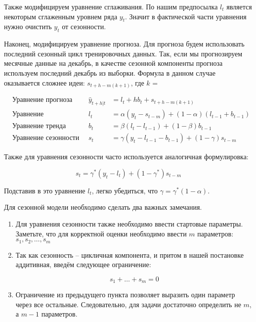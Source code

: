 \documentclass[12pt,fleqn]{article}
\begin{document}
Также модифицируем уравнение сглаживания. По нашим предпосылка $l_t$ является некоторым сглаженным уровнем ряда $y_t$. Значит в фактической части уравнения нужно очистить $y_t$ от сезонности.

Наконец, модифицируем уравнение прогноза. Для прогноза будем использовать последний сезонный цикл тренировочных данных. Так, если мы прогнозируем месячные данные на декабрь, в качестве сезонной компоненты прогноза используем последний декабрь из выборки. Формула в данном случае оказывается сложнее идеи: $s_{t+h-m(k+1)}$, где $k$ = 

\begin{equation}
	\begin{array}{llll}
		&\text{Уравнение прогноза} \quad & 	\hat{y}_{t+h|t}& = l_t + h b_t + s_{t+h-m(k+1)}\\
		&\text{Уравнение сглаживания}\quad & l_t& =\alpha (y_t - s_{t-m}) +(1-\alpha)(l_{t-1} + b_{t-1}) \\
		&\text{Уравнение тренда}\quad & b_t& =\beta (l_t - l_{t-1}) +(1-\beta) b_{t-1} \\
		&\text{Уравнение сезонности}\quad & s_t& =\gamma (y_t - l_{t-1} - b_{t-1}) +(1-\gamma) s_{t-m}
	\end{array}
\end{equation}

Также для уравнения сезонности часто используется аналогичная формулировка:

\begin{equation}
s_t  =\gamma^{\ast} (y_t - l_{t}) +(1-\gamma^{\ast}) s_{t-m}
\end{equation}

Подставив в это уравнение $l_t$, легко убедиться, что $\gamma = \gamma^{\ast}(1 - \alpha)$.

Для сезонной модели необходимо сделать два важных замечания.

\begin{enumerate}
	\item Для уравнения сезонности также необходимо ввести стартовые параметры. Заметьте, что для корректной оценки необходимо ввести $m$ параметров: $s_1, s_2, \ldots, s_m$
	
	\item Так как сезонность -- цикличная компонента, и притом в нашей постановке аддитивная, введём следующее ограничение:
	
	\[
	s_1 + \ldots + s_m = 0
	\]
	
	\item Ограничение из предыдущего пункта позволяет выразить один параметр через все остальные. Следовательно, для задачи достаточно определить не $m$, а $m-1$ параметров.
\end{enumerate}
\end{document}
